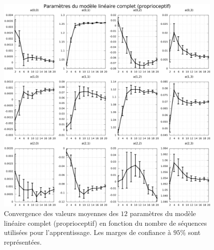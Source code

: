 \begin{figure}[h]
    \centerfloat
    \includegraphics[type=pdf,ext=.pdf,read=.pdf,width=0.9\linewidth]{../plot/OdometryCMAES/parametersFullReads}
    \caption{\label{fig:odometry_cmaes_parameters_full_reads} 
        Convergence des valeurs moyennes des $12$ paramètres du modèle linéaire complet (proprioceptif)
        en fonction du nombre de séquences utilisées pour l'apprentissage.
        Les marges de confiance à $95\%$ sont représentées.
    }
\end{figure}

